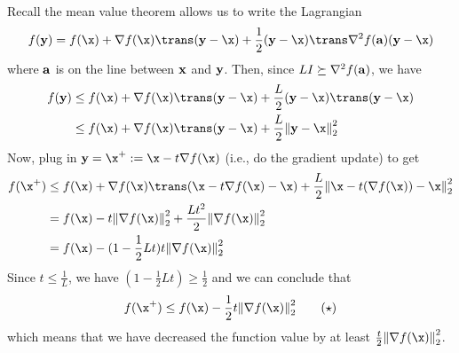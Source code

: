 \documentclass[class=cs480,notes,tikz]{agony}
\begin{document}
\begin{prf}
  Recall the mean value theorem allows us to write the Lagrangian
  \[
    f(\vb y) = f(\x) + \nabla f(\x)\trans(\vb y - \x) + \frac12(\vb y - \x)\trans\nabla^2 f(\vb a)(\vb y-\x)
  \]
  where $\vb a$ is on the line between $\vb x$ and $\vb y$.
  Then, since $LI \succeq \nabla^2 f(\vb a)$, we have
  \begin{align*}
    f(\vb y)
     & \leq f(\x) + \nabla f(\x)\trans(\vb y - \x) + \frac{L}2(\vb y - \x)\trans(\vb y-\x) \\
     & \leq f(\x) + \nabla f(\x)\trans(\vb y - \x) + \frac{L}2\norm{\vb y - \x}_2^2
  \end{align*}
  Now, plug in $\vb y = \x^+ := \x - t\nabla f(\x)$ (i.e., do the gradient update) to get
  \begin{align*}
    f(\x^+)
     & \leq f(\x) + \nabla f(\x)\trans(\x - t\nabla f(\x) - \x) + \frac{L}2\norm{\x - t(\nabla f(\x)) - \x}_2^2 \\
     & = f(\x) - t\norm{\nabla f(\x)}_2^2 + \frac{Lt^2}2\norm{\nabla f(\x)}_2^2                                 \\
     & = f(\x) - (1-\frac12 Lt)t\norm{\nabla f(\x)}_2^2
  \end{align*}
  Since $t \leq \frac1L$, we have $(1-\frac12Lt) \geq \frac12$ and we can conclude that
  \[
    f(\x^+) \leq f(\x) - \frac12t\norm{\nabla f(\x)}^2_2 \tag{$\star$}
  \]
  which means that we have decreased the function value by at least $\frac{t}{2}\norm{\nabla f(\x)}_2^2$.


\end{prf}
\end{document}
